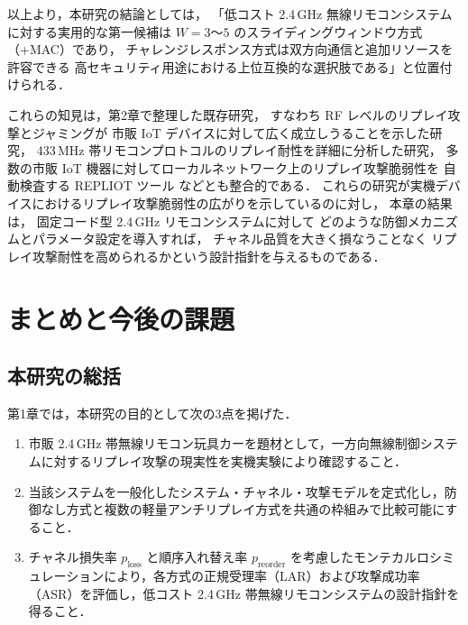 \documentclass[twocolumn,10pt,a4paper]{jsarticle}
\begin{document}
以上より，本研究の結論としては，
「低コスト 2.4\,GHz 無線リモコンシステムに対する実用的な第一候補は
$W=3$～$5$ のスライディングウィンドウ方式（+MAC）であり，
チャレンジレスポンス方式は双方向通信と追加リソースを許容できる
高セキュリティ用途における上位互換的な選択肢である」と位置付けられる．

これらの知見は，第2章で整理した既存研究，
すなわち RF レベルのリプレイ攻撃とジャミングが
市販 IoT デバイスに対して広く成立しうることを示した研究\cite{Anthi2024RFVuln}，
433\,MHz 帯リモコンプロトコルのリプレイ耐性を詳細に分析した研究\cite{Mykhaylova2024RCReplay}，
多数の市販 IoT 機器に対してローカルネットワーク上のリプレイ攻撃脆弱性を
自動検査する REPLIOT ツール\cite{Lazzaro2024,LazzaroREPLIOT} などとも整合的である．
これらの研究が実機デバイスにおけるリプレイ攻撃脆弱性の広がりを示しているのに対し，
本章の結果は，
固定コード型 2.4\,GHz リモコンシステムに対して
どのような防御メカニズムとパラメータ設定を導入すれば，
チャネル品質を大きく損なうことなく
リプレイ攻撃耐性を高められるかという設計指針を与えるものである．

\section{まとめと今後の課題}

\subsection{本研究の総括}

第1章では，本研究の目的として次の3点を掲げた．
\begin{enumerate}
  \item 市販 2.4\,GHz 帯無線リモコン玩具カーを題材として，一方向無線制御システムに対するリプレイ攻撃の現実性を実機実験により確認すること．
  \item 当該システムを一般化したシステム・チャネル・攻撃モデルを定式化し，防御なし方式と複数の軽量アンチリプレイ方式を共通の枠組みで比較可能にすること．
  \item チャネル損失率 $p_{\mathrm{loss}}$ と順序入れ替え率 $p_{\mathrm{reorder}}$ を考慮したモンテカルロシミュレーションにより，各方式の正規受理率（LAR）および攻撃成功率（ASR）を評価し，低コスト 2.4\,GHz 帯無線リモコンシステムの設計指針を得ること．
\end{enumerate}
\end{document}
